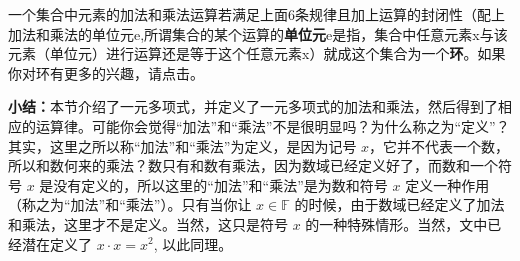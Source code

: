 一个集合中元素的加法和乘法运算若满足上面6条规律且加上运算的封闭性（配上加法和乘法的单位元e,所谓集合的某个运算的\textbf{单位元}e是指，集合中任意元素x与该元素（单位元）进行运算还是等于这个任意元素x）就成这个集合为一个\textbf{环}。如果你对环有更多的兴趣，请点击。

\textbf{小结：}本节介绍了一元多项式，并定义了一元多项式的加法和乘法，然后得到了相应的运算律。可能你会觉得“加法”和“乘法”不是很明显吗？为什么称之为“定义”？其实，这里之所以称“加法”和“乘法”为定义，是因为记号 $x$，它并不代表一个数，所以和数何来的乘法？数只有和数有乘法，因为数域已经定义好了，而数和一个符号 $x$ 是没有定义的，所以这里的“加法”和“乘法”是为数和符号 $x$ 定义一种作用（称之为“加法”和“乘法”）。只有当你让 $x\in \mathbb{F}$ 的时候，由于数域已经定义了加法和乘法，这里才不是定义。当然，这只是符号 $x$ 的一种特殊情形。当然，文中已经潜在定义了 $x\cdot x=x^2$, 以此同理。